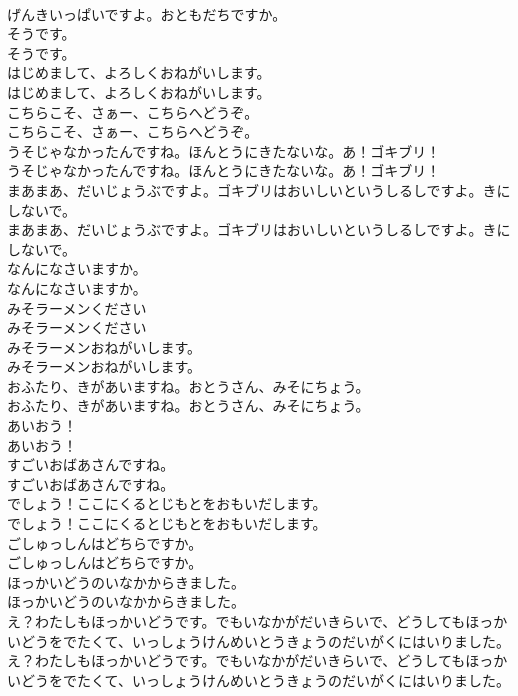\documentclass[8pt]{extreport}
\begin{document}
\begin{CJK}{UTF8}{min}
\\	げんきいっぱいですよ。おともだちですか。 
\\	そうです。	
\\	そうです。 
\\	はじめまして、よろしくおねがいします。	
\\	はじめまして、よろしくおねがいします。 
\\	こちらこそ、さぁー、こちらへどうぞ。	
\\	こちらこそ、さぁー、こちらへどうぞ。 
\\	うそじゃなかったんですね。ほんとうにきたないな。あ！ゴキブリ！	
\\	うそじゃなかったんですね。ほんとうにきたないな。あ！ゴキブリ！ 
\\	まあまあ、だいじょうぶですよ。ゴキブリはおいしいというしるしですよ。きにしないで。	
\\	まあまあ、だいじょうぶですよ。ゴキブリはおいしいというしるしですよ。きにしないで。 
\\	なんになさいますか。	
\\	なんになさいますか。 
\\	みそラーメンください	
\\	みそラーメンください 
\\	みそラーメンおねがいします。	
\\	みそラーメンおねがいします。 
\\	おふたり、きがあいますね。おとうさん、みそにちょう。	
\\	おふたり、きがあいますね。おとうさん、みそにちょう。 
\\	あいおう！	
\\	あいおう！ 
\\	すごいおばあさんですね。	
\\	すごいおばあさんですね。 
\\	でしょう！ここにくるとじもとをおもいだします。	
\\	でしょう！ここにくるとじもとをおもいだします。 
\\	ごしゅっしんはどちらですか。	
\\	ごしゅっしんはどちらですか。 
\\	ほっかいどうのいなかからきました。	
\\	ほっかいどうのいなかからきました。 
\\	え？わたしもほっかいどうです。でもいなかがだいきらいで、どうしてもほっかいどうをでたくて、いっしょうけんめいとうきょうのだいがくにはいりました。	
\\	え？わたしもほっかいどうです。でもいなかがだいきらいで、どうしてもほっかいどうをでたくて、いっしょうけんめいとうきょうのだいがくにはいりました。 

\end{CJK}
\end{document}
